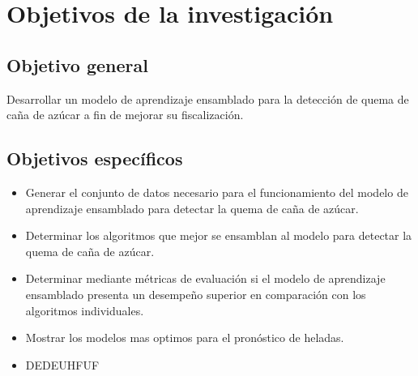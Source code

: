\section{Objetivos de la investigación}
\subsection{Objetivo general}
Desarrollar un modelo de aprendizaje ensamblado para la detección de quema de caña de azúcar a fin de mejorar su fiscalización.
\subsection{Objetivos específicos}
\begin{itemize}
    \item Generar el conjunto de datos necesario para el funcionamiento del modelo de aprendizaje ensamblado para detectar la quema de caña de azúcar.
    \item Determinar los algoritmos que mejor se ensamblan al modelo para detectar la quema de caña de azúcar.
    \item Determinar mediante métricas de evaluación si el modelo de aprendizaje ensamblado presenta un desempeño superior en comparación con los algoritmos individuales.
    \item Mostrar los modelos mas optimos para el pronóstico de heladas.
    \item DEDEUHFUF
\end{itemize}
